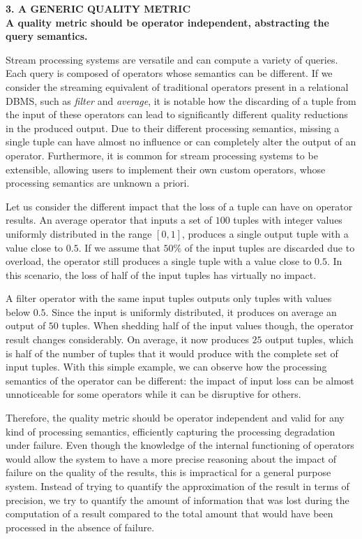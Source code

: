 \textbf{3. A GENERIC QUALITY METRIC \\ A quality metric should be operator independent, abstracting
the query semantics.}

Stream processing systems are versatile and can compute a variety of queries. Each query is composed of
operators whose semantics can be different. If we consider the streaming equivalent of traditional
operators present in a relational DBMS, such as \textit{filter} and \textit{average}, it is notable how
the discarding of a tuple from the input of these operators can lead to significantly different quality
reductions in the produced output. Due to their different processing semantics, missing a single tuple
can have almost no influence or can completely alter the output of an operator.
Furthermore, it is common for stream processing systems to be extensible, allowing users to implement
their own custom operators, whose processing semantics are unknown a priori.

Let us consider the different impact that the loss of a tuple can have on operator results.
An average operator \DIFdelbegin \DIFdel{, }\DIFdelend that inputs a set of $100$ tuples with integer values uniformly distributed in the
range $[0,1]$, produces a single output tuple with a value close to $0.5$.
If we assume that $50\%$ of the input tuples are discarded due to overload, the operator still produces a
single tuple with a value close to $0.5$. In this scenario, the loss of half of the input tuples has
virtually no impact.

A filter operator with the same input tuples outputs only tuples with values below $0.5$. Since
the input is uniformly distributed, it produces on average an output of $50$ tuples.
When shedding half of the input values though, the operator result changes considerably. On average, it
now produces $25$ output tuples, which is half of the number of tuples that it would produce with the
complete set of input tuples. With this simple example, we can observe how the processing semantics of
the operator can be different: the impact of input loss can be almost unnoticeable for some operators
while it can be disruptive for others.

Therefore, the quality metric should be operator independent and valid for any kind of processing
semantics, efficiently capturing the processing degradation under failure. Even though the knowledge of
the internal functioning of operators would allow the system to have a more precise reasoning about the
impact of failure on the quality of the results, this is impractical for a general purpose system.
Instead of trying to quantify the approximation of the result in terms of  precision, we try to quantify
the amount of information that was lost during the computation of a result compared to the total amount
that would have been processed in the absence of failure.

